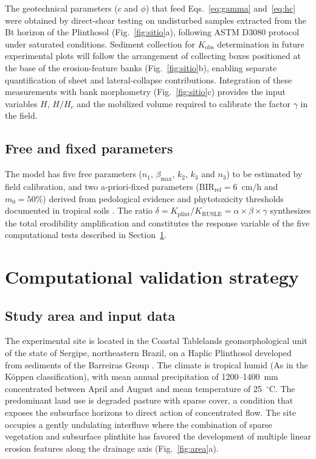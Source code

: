 \documentclass[pdflatex,sn-basic,referee,lineno]{sn-jnl}
\begin{document}
The geotechnical parameters ($c$ and $\phi$) that feed Eqs.~\ref{eq:gamma} and~\ref{eq:hc} were obtained by direct-shear testing on undisturbed samples extracted from the Bt horizon of the Plinthosol (Fig.~\ref{fig:sitio}a), following ASTM D3080 protocol under saturated conditions. Sediment collection for $K_{\mathrm{obs}}$ determination in future experimental plots will follow the arrangement of collecting boxes positioned at the base of the erosion-feature banks (Fig.~\ref{fig:sitio}b), enabling separate quantification of sheet and lateral-collapse contributions. Integration of these measurements with bank morphometry (Fig.~\ref{fig:sitio}c) provides the input variables $H$, $H/H_c$ and the mobilized volume required to calibrate the factor $\gamma$ in the field.

\subsection{Free and fixed parameters}

The model has five free parameters ($n_1$, $\beta_{\max}$, $k_2$, $k_3$ and $n_3$) to be estimated by field calibration, and two a-priori-fixed parameters ($\mathrm{BIR_{ref}} = 6$~cm/h and $m_0 = 50\%$) derived from pedological evidence and phytotoxicity thresholds documented in tropical soils \citep{embrapa_2018}. The ratio $\delta = K_{\mathrm{plint}} / K_{\mathrm{RUSLE}} = \alpha \times \beta \times \gamma$ synthesizes the total erodibility amplification and constitutes the response variable of the five computational tests described in Section~\ref{sec:validation}.

\section{Computational validation strategy}
\label{sec:validation}

\subsection{Study area and input data}

The experimental site is located in the Coastal Tablelands geomorphological unit of the state of Sergipe, northeastern Brazil, on a Haplic Plinthosol developed from sediments of the Barreiras Group \citep{nascimento_pedrotti_2004}. The climate is tropical humid (As in the K\"{o}ppen classification), with mean annual precipitation of 1200--1400~mm concentrated between April and August and mean temperature of 25~$^\circ$C. The predominant land use is degraded pasture with sparse cover, a condition that exposes the subsurface horizons to direct action of concentrated flow. The site occupies a gently undulating interfluve where the combination of sparse vegetation and subsurface plinthite has favored the development of multiple linear erosion features along the drainage axis (Fig.~\ref{fig:area}a).
\end{document}
